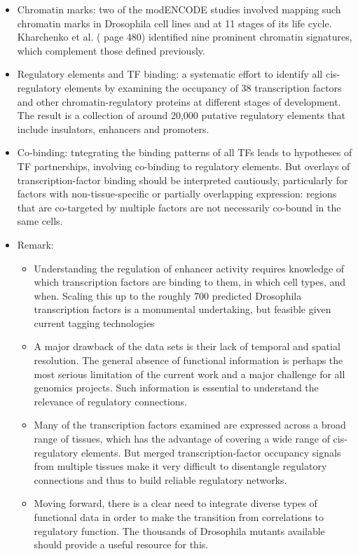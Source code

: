 \documentclass{report}
\begin{document}
\begin{enumerate}
\begin{itemize}
		\item Chromatin marks: two of the modENCODE studies involved mapping such chromatin marks in Drosophila cell lines and at 11 stages of its life cycle. 
		Kharchenko et al. ( page 480) identified nine prominent chromatin signatures, which complement those defined previously. 
		
		\item Regulatory elements and TF binding: a systematic effort to identify all cis-regulatory elements by examining the occupancy of 38 transcription factors and other chromatin-regulatory proteins at different stages of development. The result is a collection of around 20,000 putative regulatory elements that include insulators, enhancers and promoters.
		
		\item Co-binding: tntegrating the binding patterns of all TFs leads to hypotheses of TF partnerships, involving co-binding to regulatory elements. But overlays of transcription-factor binding should be interpreted cautiously, particularly for factors with non-tissue-specific or partially overlapping expression: regions that are co-targeted by multiple factors are not necessarily co-bound in the same cells. 
		
		\item Remark: 
		\begin{itemize}
			\item Understanding the regulation of enhancer activity requires knowledge of which transcription factors are binding to them, in which cell types, and when. Scaling this up to the roughly 700 predicted Drosophila transcription factors is a monumental undertaking, but feasible given current tagging technologies
			\item A major drawback of the data sets is their lack of temporal and spatial resolution. The general absence of functional information is perhaps the most serious limitation of the current work and a major challenge for all genomics projects. Such information is essential to understand the relevance of regulatory connections. 
			\item Many of the transcription factors examined are expressed across a broad range of tissues, which has the advantage of covering a wide range of cis-regulatory elements. But merged transcription-factor occupancy signals from multiple tissues make it very difficult to disentangle regulatory connections and thus to build reliable regulatory networks.
			\item Moving forward, there is a clear need to integrate diverse types of functional data in order to make the transition from correlations to regulatory function. The thousands of Drosophila mutants available should provide a useful resource for this. 
		\end{itemize}
	\end{itemize}
	
\end{enumerate}
\end{document}

